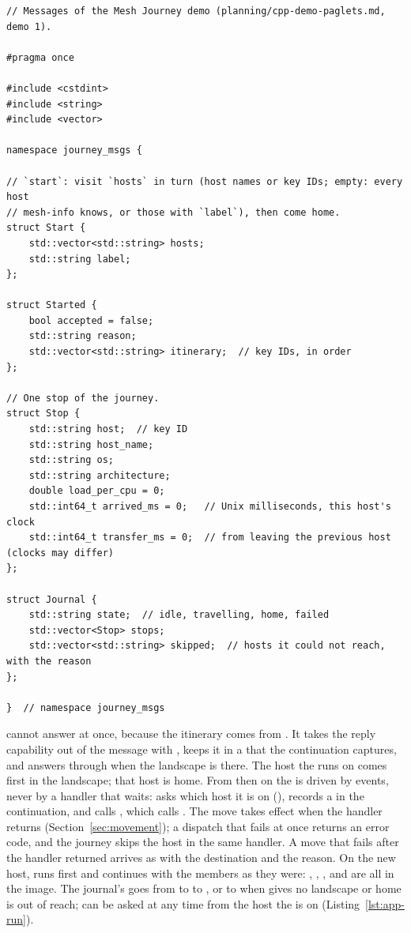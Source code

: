 \begin{lstlisting}[style=paglets-cpp,caption={The journey's messages and journal \src{cpp/examples/journey/journey\_msgs.hpp}},label={lst:app-journey-messages}]
// Messages of the Mesh Journey demo (planning/cpp-demo-paglets.md, demo 1).

#pragma once

#include <cstdint>
#include <string>
#include <vector>

namespace journey_msgs {

// `start`: visit `hosts` in turn (host names or key IDs; empty: every host
// mesh-info knows, or those with `label`), then come home.
struct Start {
    std::vector<std::string> hosts;
    std::string label;
};

struct Started {
    bool accepted = false;
    std::string reason;
    std::vector<std::string> itinerary;  // key IDs, in order
};

// One stop of the journey.
struct Stop {
    std::string host;  // key ID
    std::string host_name;
    std::string os;
    std::string architecture;
    double load_per_cpu = 0;
    std::int64_t arrived_ms = 0;   // Unix milliseconds, this host's clock
    std::int64_t transfer_ms = 0;  // from leaving the previous host (clocks may differ)
};

struct Journal {
    std::string state;  // idle, travelling, home, failed
    std::vector<Stop> stops;
    std::vector<std::string> skipped;  // hosts it could not reach, with the reason
};

}  // namespace journey_msgs
\end{lstlisting}

 cannot answer at once, because the itinerary comes from
. It takes the reply capability out of the message with
, keeps it in a  that the
continuation captures, and answers through  when the
landscape is there. The host the \paglet{} runs on comes first in the
landscape; that host is home. From then on the \paglet{} is driven by
events, never by a handler that waits:  asks
 which host it is on (), records a
 in the continuation, and calls , which calls
. The move takes effect when the handler returns
(Section~\ref{sec:movement}); a dispatch that fails at once returns an
error code, and the journey skips the host in the same handler. A move
that fails after the handler returned arrives as 
with the destination and the reason. On the new host, 
runs first and continues with the members as they were: ,
, ,  and  are
all in the image. The journal's 
goes from  to  to , or to
 when  gives no landscape or home is out of
reach;  can be asked at any time from the host the
\paglet{} is on (Listing~\ref{lst:app-run}).

